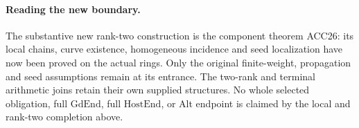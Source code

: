 \paragraph{Reading the new boundary.}
The substantive new rank-two construction is the component theorem
ACC26: its local chains, curve existence, homogeneous incidence and
seed localization have now been proved on the actual rings.  Only
the original finite-weight, propagation and seed assumptions remain
at its entrance.  The two-rank and terminal arithmetic joins retain
their own supplied structures.  No whole selected obligation, full
\(\mathrm{GdEnd}\), full \(\mathrm{HostEnd}\), or Alt endpoint
is claimed by the local and rank-two completion above.
